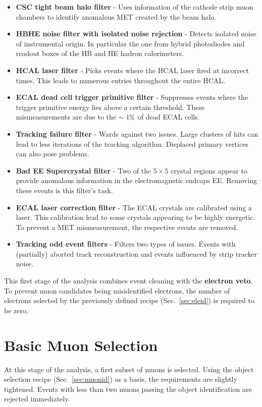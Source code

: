 \begin{itemize}
\item \textbf{CSC tight beam halo filter} - Uses information of the cathode strip muon chambers to identify anomalous MET created by the beam halo.
\item \textbf{HBHE noise filter with isolated noise rejection} - Detects isolated noise of instrumental origin. In particular the one from hybrid photodiodes and readout boxes of the HB and HE hadron calorimeters.
\item \textbf{HCAL laser filter} - Picks events where the HCAL laser fired at incorrect times. This leads to numerous entries throughout the entire HCAL.
\item \textbf{ECAL dead cell trigger primitive filter} - Suppresses events where the trigger primitive energy lies above a certain threshold. These mismeasurements are due to the $\sim 1\pct$ of dead ECAL cells.
\item \textbf{Tracking failure filter} - Wards against two issues. Large clusters of hits can lead to less iterations of the tracking algorithm. Displaced primary vertices can also pose problems.
\item \textbf{Bad EE Supercrystal filter} - Two of the $5 \times 5$ crystal regions appear to provide anomalous information in the electromagnetic endcaps EE. Removing these events is this filter's task.
\item \textbf{ECAL laser correction filter} - The ECAL crystals are calibrated using a laser. This calibration lead to some crystals appearing to be highly energetic. To prevent a MET mismeasurement, the respective events are removed. 
\item \textbf{Tracking odd event filters} - Filters two types of issues. Events with (partially) aborted track reconstruction and events influenced by strip tracker noise.
\end{itemize}

This first stage of the analysis combines event cleaning with the \textbf{electron veto}. To prevent muon candidates being misidentified electrons, the number of electrons selected by the previously defined recipe (Sec.~\ref{sec:eleid}) is required to be zero.

\section{Basic Muon Selection}
\label{sec:basicmuon}

At this stage of the analysis, a first subset of muons is selected. Using the object selection recipe (Sec.~\ref{sec:muonid}) as a basis, the requirements are slightly tightened. Events with less than two muons passing the object identification are rejected immediately.

